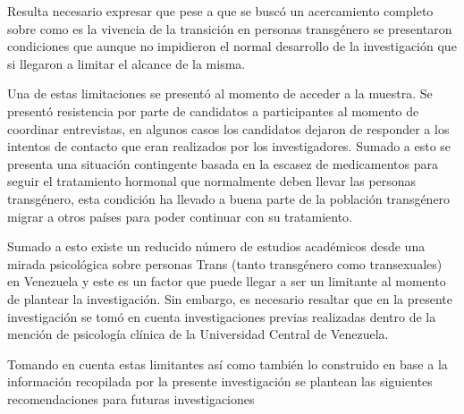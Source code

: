 Resulta necesario expresar que pese a que se buscó un acercamiento completo
sobre como es la vivencia de la transición en personas transgénero se
presentaron condiciones que aunque no impidieron el normal desarrollo de la
investigación que si llegaron a limitar el alcance de la misma.

Una de estas limitaciones se presentó al momento de acceder a la muestra. Se
presentó resistencia por parte de candidatos a participantes al momento de
coordinar entrevistas, en algunos casos los candidatos dejaron de responder a
los intentos de contacto que eran realizados por los investigadores. Sumado a
esto se presenta una situación contingente basada en la escasez de medicamentos
para seguir el tratamiento hormonal que normalmente deben llevar las personas
transgénero, esta condición ha llevado a buena parte de la población transgénero
migrar a otros países para poder continuar con su tratamiento.

Sumado a esto existe un reducido número de estudios académicos desde una mirada
psicológica sobre personas Trans (tanto transgénero como transexuales) en
Venezuela y este es un factor que puede llegar a ser un limitante al momento de
plantear la investigación. Sin embargo, es necesario resaltar que en la presente
investigación se tomó en cuenta investigaciones previas realizadas dentro de
la mención de psicología clínica de la Universidad Central de Venezuela.

Tomando en cuenta estas limitantes así como también lo construido en base a la
información recopilada por la presente investigación se plantean las siguientes
recomendaciones para futuras investigaciones

